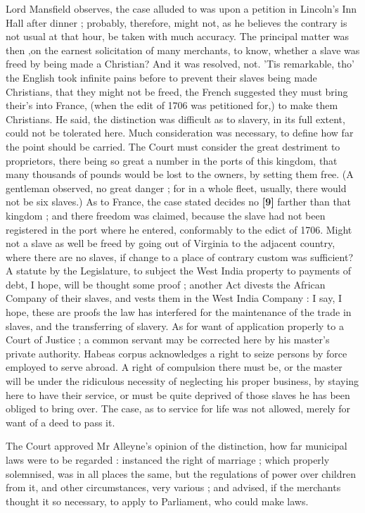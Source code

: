 \documentclass[a4paper]{article}
\begin{document}
Lord Mansfield observes, the case alluded to was upon a petition in Lincoln's Inn Hall after dinner ; probably, therefore, might not, as he believes the contrary is not usual at that hour, be taken with much accuracy. The principal matter was then ,on the earnest solicitation of many merchants, to know, whether a slave was freed by being made a Christian? And it was resolved, not. 'Tis remarkable, tho' the English took  infinite pains before to prevent their slaves being made Christians, that they might not be freed, the French suggested they must bring their's into France, (when the edit of 1706 was petitioned for,) to make them Christians. He said, the distinction was difficult as to slavery, in its full extent, could not be tolerated here. Much consideration was necessary, to define how far the point should be carried. The Court must consider the great destriment to proprietors, there being so great a number in the ports of this kingdom, that many thousands of pounds would be lost to the owners, by setting them free. (A gentleman observed, no great danger ; for in a whole fleet, usually, there would not be six slaves.) As to France, the case stated decides no \textbf{[9]} farther than that kingdom ; and there freedom was claimed, because the slave had not been registered in the port where he entered, conformably to the edict of 1706. Might not a slave as well be freed by going out of Virginia to the adjacent country, where there are no slaves, if change to a place of contrary custom was sufficient? A statute by the Legislature, to subject the West India property to payments of debt, I hope, will be thought some proof ; another Act divests the African Company of their slaves, and vests them in the West India Company : I say, I hope, these are proofs the law has interfered for the maintenance of the trade in slaves, and the transferring of slavery. As for want of application properly to a Court of Justice ; a common servant may be corrected here by his master's private authority. Habeas corpus acknowledges a right to seize persons by force employed to serve abroad. A right of compulsion there must be, or the master will be under the ridiculous necessity of neglecting his proper business, by staying here to have their service, or must be quite deprived of those slaves he has been obliged to bring over. The case, as to service for life was not allowed, merely for want of a deed to pass it.

The Court approved Mr Alleyne's opinion of the distinction, how far municipal laws were to be regarded : instanced the right of marriage ; which properly solemnised, was in all places the same, but the regulations of power over children from it, and other circumstances, very various ; and advised, if the merchants thought it so necessary, to apply to Parliament, who could make laws.
\end{document}
